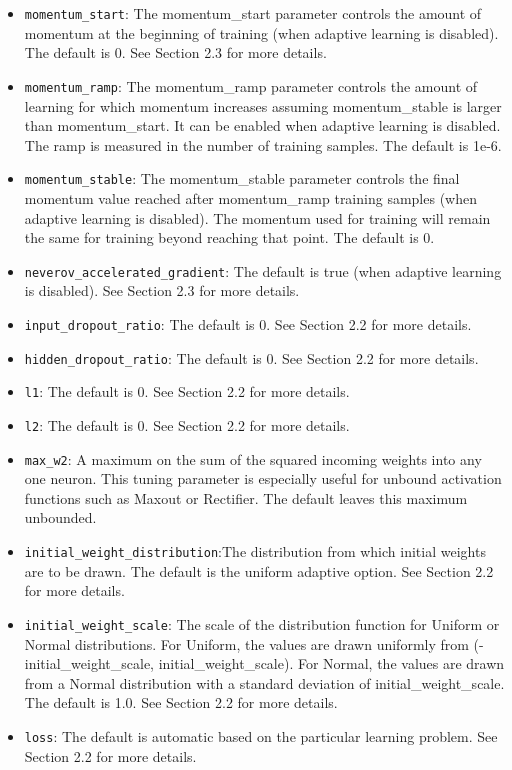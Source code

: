 \documentclass[12pt]{article}
\begin{document}
\begin{itemize}
\item \texttt{momentum\_start}: The momentum\_start parameter controls the amount of momentum at the beginning of training (when adaptive learning is disabled). The default is 0. See Section 2.3 for more details. 
\item \texttt{momentum\_ramp}: The momentum\_ramp parameter controls the amount of learning for which momentum increases assuming momentum\_stable is larger than momentum\_start. It can be enabled when adaptive learning is disabled. The ramp is measured in the number of training samples. The default is 1e-6. 
\item \texttt{momentum\_stable}: The momentum\_stable parameter controls the final momentum value reached after momentum\_ramp training samples (when adaptive learning is disabled). The momentum used for training will remain the same for training beyond reaching that point. The default is 0. 
\item \texttt{neverov\_accelerated\_gradient}: The default is true (when adaptive learning is disabled). See Section 2.3 for more details.
\item \texttt{input\_dropout\_ratio}: The default is 0. See Section 2.2 for more details.
\item \texttt{hidden\_dropout\_ratio}: The default is 0. See Section 2.2 for more details.
\item \texttt{l1}: The default is 0. See Section 2.2 for more details. 
\item \texttt{l2}: The default is 0. See Section 2.2 for more details.
\item \texttt{max\_w2}: A maximum on the sum of the squared incoming weights into any one neuron. This tuning parameter is especially useful for unbound activation functions such as Maxout or Rectifier. The default leaves this maximum unbounded.
\item \texttt{initial\_weight\_distribution}:The distribution from which initial weights are to be drawn. The default is the uniform adaptive option. See Section 2.2 for more details. 
\item \texttt{initial\_weight\_scale}: The scale of the distribution function for Uniform or Normal distributions. For Uniform, the values are drawn uniformly from (-initial\_weight\_scale, initial\_weight\_scale). For Normal, the values are drawn from a Normal distribution with a standard deviation of initial\_weight\_scale. The default is 1.0. See Section 2.2 for more details.  
\item \texttt{loss}: The default is automatic based on the particular learning problem. See Section 2.2 for more details.

\end{itemize}
\end{document}
